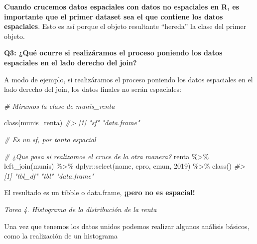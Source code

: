 \documentclass[
]{report}
\newenvironment{Shaded}{\begin{snugshade}}{\end{snugshade}}
\newcommand{\AttributeTok}[1]{\textcolor[rgb]{0.77,0.63,0.00}{#1}}
\newcommand{\CommentTok}[1]{\textcolor[rgb]{0.56,0.35,0.01}{\textit{#1}}}
\newcommand{\FunctionTok}[1]{\textcolor[rgb]{0.00,0.00,0.00}{#1}}
\newcommand{\NormalTok}[1]{#1}
\newcommand{\SpecialCharTok}[1]{\textcolor[rgb]{0.00,0.00,0.00}{#1}}
\newcommand{\StringTok}[1]{\textcolor[rgb]{0.31,0.60,0.02}{#1}}
\theoremstyle{definition}
\theoremstyle{definition}
\theoremstyle{definition}
\theoremstyle{definition}
\theoremstyle{remark}
\begin{document}
\textbf{Cuando crucemos datos espaciales con datos no espaciales en R, es importante
que el primer dataset sea el que contiene los datos espaciales}. Esto es así
porque el objeto resultante ``hereda'' la clase del primer objeto.

\textbf{Q3: ¿Qué ocurre si realizáramos el proceso poniendo los datos espaciales en el
lado derecho del join?}

A modo de ejemplo, si realizáramos el proceso poniendo los datos espaciales en
el lado derecho del join, los datos finales no serán espaciales:

\begin{Shaded}
\begin{Highlighting}[]

\CommentTok{\# Miramos la clase de munis\_renta}

\FunctionTok{class}\NormalTok{(munis\_renta)}
\CommentTok{\#\textgreater{} [1] "sf"         "data.frame"}

\CommentTok{\# Es un sf, por tanto espacial}

\CommentTok{\# ¿Que pasa si realizamos el cruce de la otra manera?}
\NormalTok{renta }\SpecialCharTok{\%\textgreater{}\%}
  \FunctionTok{left\_join}\NormalTok{(munis) }\SpecialCharTok{\%\textgreater{}\%}
\NormalTok{  dplyr}\SpecialCharTok{::}\FunctionTok{select}\NormalTok{(name, cpro, cmun, }\StringTok{\textasciigrave{}}\AttributeTok{2019}\StringTok{\textasciigrave{}}\NormalTok{) }\SpecialCharTok{\%\textgreater{}\%}
  \FunctionTok{class}\NormalTok{()}
\CommentTok{\#\textgreater{} [1] "tbl\_df"     "tbl"        "data.frame"}
\end{Highlighting}
\end{Shaded}

El resultado es un tibble o data.frame, \textbf{¡pero no es espacial!}

\emph{Tarea 4. Histograma de la distribución de la renta}

Una vez que tenemos los datos unidos podemos realizar algunos análisis básicos,
como la realización de un histograma
\end{document}
